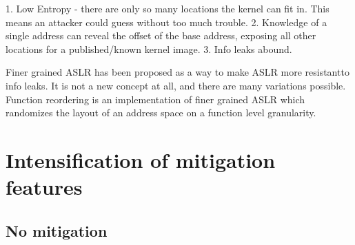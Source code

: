 \documentclass{masterthesis}
\begin{document}
1. Low Entropy - there are only so many locations the kernel can fit in. This means an attacker could guess without too much trouble.
2. Knowledge of a single address can reveal the offset of the base address, exposing all other locations for a published/known kernel image.
3. Info leaks abound.

Finer grained ASLR has been proposed as a way to make ASLR more resistantto info leaks. It is not a new concept at all, and there are many variations possible. Function reordering is an implementation of finer grained ASLR which randomizes the layout of an address space on a function level granularity.

\chapter{Intensification of mitigation features}
\label{ch:adding mitigation}
\section{No mitigation}
\end{document}
